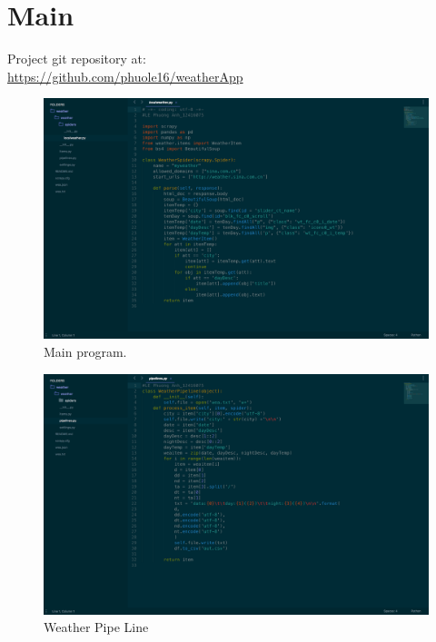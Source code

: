 \documentclass{article}
\begin{document}
\section{Main}\label{sec:main}
Project git repository at:\\
\url{https://github.com/phuole16/weatherApp}
\begin{figure}[h]
 \begin{center}
  \includegraphics[width=\linewidth]{main}
  \caption{Main program.}
  \label{fig:MainCode}
 \end{center}
\end{figure}
\begin{figure}[h]
  \includegraphics[width=\linewidth]{item1}
  \caption{Weather Pipe Line}
  \label{fig:WeatherPLine}
\end{figure}
\end{document}
